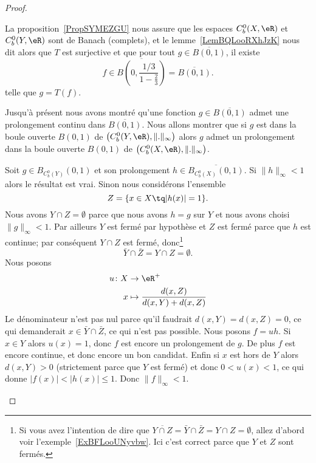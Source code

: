\begin{proof}
\begin{subproof}

		La proposition~\ref{PropSYMEZGU} nous assure que les espaces \( C^0_b(X,\eR)\) et \( C_b^0(Y,\eR)\) sont de Banach (complets), et le lemme~\ref{LemBQLooRXhJzK} nous dit alors que \( T\) est surjective et que pour tout \( g\in\overline{ B(0,1) }\), il existe
		\begin{equation}
			f\in\overline{ B\left( 0,\frac{ 1/3 }{ 1-\frac{ 2 }{ 3 } } \right) }=\overline{ B(0,1) }.
		\end{equation}
		telle que \( g=T(f)\).



		Jusqu'à présent nous avons montré qu'une fonction \( g\in\overline{ B(0,1) }\) admet une prolongement continu dans \( \overline{ B(0,1) }\). Nous allons montrer que si \( g\) est dans la boule ouverte \( B(0,1)\) de \( \big( C^0_b(Y,\eR),\| . \|_{\infty} \big)\) alors \( g\) admet un prolongement dans la boule ouverte \( B(0,1)\) de \( \big( C_b^0(X,\eR),\| . \|_{\infty} \big)\).

		Soit \( g\in B_{C^0_b(Y)}(0,1) \) et son prolongement \( h\in \overline{ B_{C_b^0(X)}(0,1) }\). Si \( \| h \|_{\infty}<1\) alors le résultat est vrai. Sinon nous considérons l'ensemble
		\begin{equation}		\label{EQooIVXAooZQZxlq}
			Z=\{ x\in X\tq | h(x) |=1 \}.
		\end{equation}
		Nous avons \( Y\cap Z=\emptyset\) parce que nous avons \( h=g\) sur \( Y\) et nous avons choisi \( \| g \|_{\infty}<1\). Par ailleurs \( Y\) est fermé par hypothèse et \( Z\) est fermé parce que \( h\) est continue; par conséquent \( Y\cap Z\) est fermé, donc\footnote{Si vous avez l'intention de dire que \( \overline{ Y\cap Z }=\bar Y\cap\bar Z=Y\cap Z=\emptyset\), allez d'abord voir l'exemple~\ref{ExBFLooUNyvbw}. Ici c'est correct parce que \( Y\) et \( Z\) sont fermés.}
		\begin{equation}
			\bar Y\cap\bar Z=Y\cap Z=\emptyset.
		\end{equation}
		Nous posons
		\begin{equation}
			\begin{aligned}
				u\colon X & \to \eR^+                                \\
				x         & \mapsto \frac{ d(x,Z) }{ d(x,Y)+d(x,Z) }
			\end{aligned}
		\end{equation}
		Le dénominateur n'est pas nul parce qu'il faudrait \( d(x,Y)=d(x,Z)=0\), ce qui demanderait \( x\in \bar Y\cap\bar Z\), ce qui n'est pas possible. Nous posons \( f=uh\). Si \( x\in Y\) alors \( u(x)=1\), donc \( f\) est encore un prolongement de \( g\). De plus \( f\) est encore continue, et donc encore un bon candidat. Enfin si \( x\) est hors de \( Y\) alors \( d(x,Y)>0\) (strictement parce que \( Y\) est fermé) et donc \( 0<u(x)<1\), ce qui donne \( | f(x) |<| h(x) |\leq 1\). Donc \( \| f \|_{\infty}<1\).


\end{subproof}
\end{proof}
